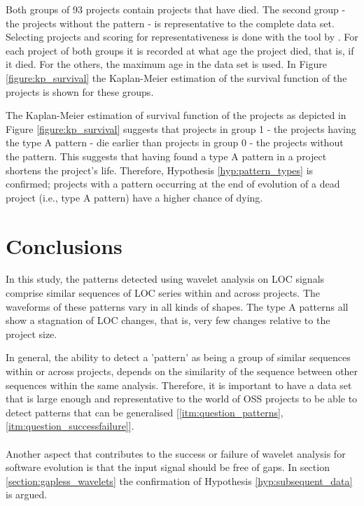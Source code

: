 Both groups of 93 projects contain projects that have died. The second group -
the projects without the pattern - is representative to the complete data set.
Selecting projects and scoring for representativeness is done with the tool by
\citet{nagappan}. For each project of both groups it is recorded at what age the
project died, that is, if it died. For the others, the maximum age in the data
set is used. In Figure \ref{figure:kp_survival} the Kaplan-Meier estimation of
the survival function of the projects is shown for these groups.



\noindent
The Kaplan-Meier estimation of survival function of the projects as depicted in
Figure \ref{figure:kp_survival} suggests that projects in group 1 - the
projects having the type A pattern - die earlier than projects in group 0 - the
projects without the pattern. This suggests that having found a type A pattern
in a project shortens the project's life. Therefore, Hypothesis
\ref{hyp:pattern_types} is confirmed; projects with a pattern occurring at the
end of evolution of a dead project (i.e., type A pattern) have a higher chance
of dying.

\section{Conclusions}
\label{section:conclusions}
In this study, the patterns detected using wavelet analysis on LOC signals
comprise similar sequences of LOC series within and across projects. The
waveforms of these patterns vary in all kinds of shapes. The type A patterns
all show a stagnation of LOC changes, that is, very few changes relative to the
project size.

In general, the ability to detect a 'pattern' as being a group of similar
sequences within or across projects, depends on the similarity of the sequence
between other sequences within the same analysis. Therefore, it is important to
have a data set that is large enough and representative to the world of OSS
projects to be able to detect patterns that can be generalised
[\ref{itm:question_patterns}, \ref{itm:question_successfailure}].

\paragraph{}
Another aspect that contributes to the success or failure of wavelet analysis
for software evolution is that the input signal should be free of gaps. In
section \ref{section:gapless_wavelets} the confirmation of Hypothesis
\ref{hyp:subsequent_data} is argued.

